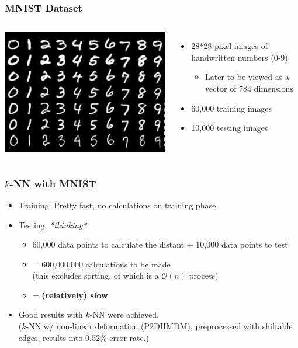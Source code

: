 \documentclass[aspectratio=169]{beamer}
\begin{document}
\begin{frame}
	\frametitle{MNIST Dataset}
	\begin{columns}
		\includegraphics[width=1.0\textwidth]{imgs/mnist.jpeg}
		\begin{itemize}
			\item<2-> 28*28 pixel images of handwritten numbers (0-9)
			\begin{itemize}
				\item<3-> Later to be viewed as a vector of 784 dimensions
			\end{itemize}
			\item<4-> 60,000 training images
			\item<5-> 10,000 testing images
		\end{itemize}
	\end{columns}
\end{frame}

\begin{frame}
	\frametitle{$k$-NN with MNIST}
	\begin{itemize}
		\item Training: Pretty fast, no calculations on training phase
		\item Testing: \textit{*thinking*}
			\begin{itemize}
				\item 60,000 data points to calculate the distant + 10,000 data points to test
				\item = 600,000,000 calculations to be made\\
					(this excludes sorting, of which is a $\mathcal{O}(n)$ process)
				\item = \textbf{(relatively) slow}
			\end{itemize}
		\item Good results with $k$-NN were achieved.\\
		($k$-NN w/ non-linear deformation (P2DHMDM), preprocessed with shiftable edges, results into 0.52\% error rate.)
	\end{itemize}
\end{frame}
\end{document}
